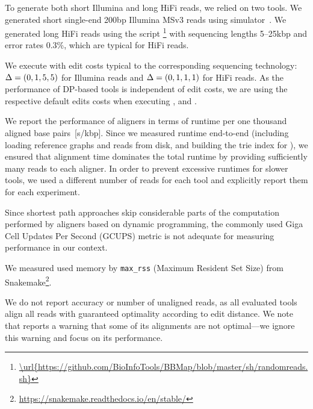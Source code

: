 To generate both short Illumina and long HiFi reads, we relied on two tools. We
generated short single-end 200bp Illumina MSv3 reads using \art
simulator~\citep{huang2011art}. We generated long HiFi reads using the script
\randomreads\footnote{\url{\url{https://github.com/BioInfoTools/BBMap/blob/master/sh/randomreads.sh}}}
with sequencing lengths \mbox{5--25kbp} and error rates 0.3\%, which are typical
for HiFi reads.

We execute \astarix with edit costs typical to the corresponding sequencing
technology: $\Delta=(0,1,5,5)$ for Illumina reads and $\Delta=(0,1,1,1)$ for
HiFi reads. As the performance of DP-based tools is independent of edit costs,
we are using the respective default edits costs when executing \graphaligner,
\pasgal and \vargas.


%
We report the performance of aligners in terms of runtime per one thousand
aligned base pairs~[s/kbp]. Since we measured runtime end-to-end (including
loading reference graphs and reads from disk, and building the trie index for
\astarix), we ensured that alignment time dominates the total runtime by
providing sufficiently many reads to each aligner. In order to prevent excessive
runtimes for slower tools, we used a different number of reads for each tool
and explicitly report them for each experiment.

Since shortest path approaches skip considerable parts of the computation
performed by aligners based on dynamic programming, the commonly used Giga Cell
Updates Per Second (GCUPS) metric is not adequate for measuring performance in
our context. 

We measured used memory by \texttt{max\_rss} (Maximum Resident Set Size) from
Snakemake\footnote{\url{https://snakemake.readthedocs.io/en/stable/}}.

We do not report accuracy or number of unaligned reads, as all evaluated
tools align all reads with guaranteed optimality according to edit distance. 
%
We note that \vargas reports a warning that some of its alignments are not
optimal---we ignore this warning and focus on its performance.
